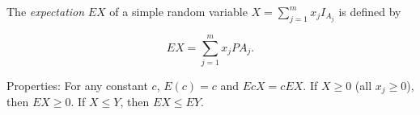 The \textit{expectation} $EX$ of a simple random variable $X = \sum_{j=1}^{m} x_j I_{A_j}$ is defined by

$$EX = \sum_{j=1}^{m} x_j PA_j.$$

Properties: For any constant $c$, $E(c) = c$ and $EcX = cEX$. If $X \geq 0$ (all $x_j \geq 0$), then $EX \geq 0$. If $X \leq Y$, then $EX \leq EY$.
